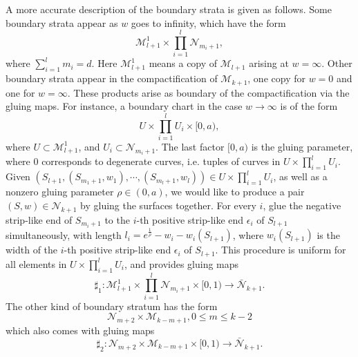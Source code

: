 \documentclass{amsart}
\numberwithin{equation}{section}
\numberwithin{figure}{section}
\begin{document}
	A more accurate description of the boundary strata is given as follows. Some boundary strata appear as $w$ goes to infinity, which have the form
\begin{equation}
\mathcal{M}_{l+1}^{1} \times \prod_{i=1}^{l} \mathcal{N}_{m_{i}+1},
\end{equation}
where $\sum_{i=1}^{l}m_{i} = d$. Here $\mathcal{M}_{l+1}^{1}$ means a copy of $\mathcal{M}_{l+1}$ arising at $w=\infty$. Other boundary strata appear in the compactification of $\mathcal{M}_{k+1}$, one copy for $w=0$ and one for $w=\infty$. These products arise as boundary of the compactification via the gluing maps. For instance, a boundary chart in the case $w \to \infty$ is of the form
\begin{equation}
U \times \prod_{i=1}^{l} U_{i} \times [0, a),
\end{equation}
where $U \subset \mathcal{M}_{l+1}^{1}$, and $U_{i} \subset \mathcal{N}_{m_{i}+1}$. The last factor $[0, a)$ is the gluing parameter, where $0$ corresponds to  degenerate curves, i.e. tuples of curves in $U \times \prod_{i=1}^{l} U_{i}$. Given $(S_{l+1}, (S_{m_{1}+1}, w_{1}), \cdots, (S_{m_{l}+1}, w_{l})) \in U \times \prod_{i=1}^{l} U_{i}$, as well as a nonzero gluing parameter $\rho \in (0, a)$, we would like to produce a pair $(S, w) \in \mathcal{N}_{k+1}$ by gluing the surfaces together. For every $i$, glue the negative strip-like end of $S_{m_{i}+1}$ to the $i$-th positive strip-like end $\epsilon_{i}$ of $S_{l+1}$ simultaneously, with length $l_{i} = e^{\frac{1}{\rho}} - w_{i} - w_{i}(S_{l+1})$, where $w_{i}(S_{l+1})$ is the width of the $i$-th positive strip-like end $\epsilon_{i}$ of $S_{l+1}$. This procedure is uniform for all elements in $U \times \prod_{i=1}^{l} U_{i}$, and provides gluing maps
\begin{equation} \label{gluing for multiplihedra: first kind}
\sharp_{1}: \mathcal{M}_{l+1}^{1} \times \prod_{i=1}^{l} \mathcal{N}_{m_{i}+1} \times [0, 1) \to \bar{\mathcal{N}}_{k+1}.
\end{equation}
The other kind of boundary stratum has the form 
\begin{equation}
\mathcal{N}_{m+2} \times \mathcal{M}_{k-m+1}, 0 \le m \le k-2
\end{equation}
which also comes with gluing maps
\begin{equation} \label{gluing for multiplihedra: second kind}
\sharp_{2}: \mathcal{N}_{m+2} \times \mathcal{M}_{k-m+1} \times [0, 1) \to \bar{\mathcal{N}}_{k+1}.
\end{equation} \par
\end{document}
